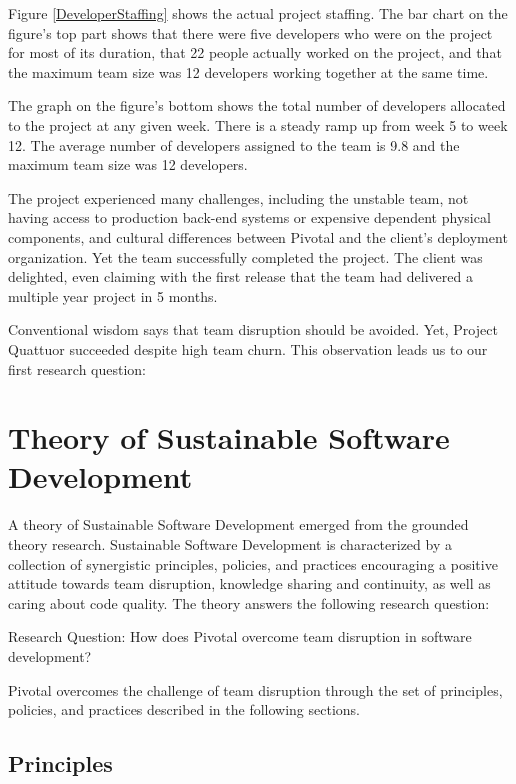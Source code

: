 Figure \ref{DeveloperStaffing} shows the actual project staffing.  The bar chart on the figure's top part shows that there were five developers who were on the project for most of its duration, that 22 people actually worked on the project, and that the maximum team size was 12 developers working together at the same time.

The graph on the figure's bottom shows the total number of developers allocated to the project at any given week. There is a steady ramp up from week 5 to week 12. The average number of developers assigned to the team is 9.8 and the maximum team size was 12 developers.

The project experienced many challenges, including the unstable team, not having access to production back-end systems or expensive dependent physical components, and cultural differences between Pivotal and the client's deployment organization. Yet the team successfully completed the project. The client was delighted, even claiming with the first release that the team had delivered a multiple year project in 5 months. 

Conventional wisdom says that team disruption should be avoided. Yet, Project Quattuor succeeded despite high team churn. This observation leads us to our first research question: 

\section{Theory of Sustainable Software Development}
\label{Theory}

A theory of Sustainable Software Development emerged from the grounded theory research. Sustainable Software Development is characterized by a collection of synergistic principles, policies, and practices encouraging a positive attitude towards team disruption, knowledge sharing and continuity, as well as caring about code quality. The theory answers the following research question:

Research Question: How does Pivotal overcome team disruption in software development?

Pivotal overcomes the challenge of team disruption through the set of principles, policies, and practices described in the following sections.
\subsection{Principles}

